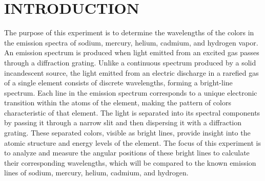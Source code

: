 \documentclass[a4paper,11pt]{article}
\begin{document}
\newpage
\renewcommand{\contentsname}{CONTENTS}
\renewcommand{\cftsecleader}{\cftdotfill{\cftdotsep}} %
\renewcommand{\cftdotsep}{1.0} %
\begin{center}
\tableofcontents
\end{center}
\label{sec:CONTENTS}

\newpage
\renewcommand{\listtablename}{LIST OF TABLES}
{}
\label{sec:LIST OF TABLES}
\begin{center}
\listoftables
\end{center}

\newpage
\renewcommand{\listfigurename}{LIST OF FIGURES}
{}
\label{sec:LIST OF FIGURES}
\begin{center}
\listoffigures
\end{center}

\newpage
{} 
\section*{\center INTRODUCTION}
\label{sec:INTRODUCTION}

\qquad The purpose of this experiment is to determine the wavelengths of the colors in the emission spectra of sodium, mercury, helium, cadmium, and hydrogen vapor. An emission spectrum is produced when light emitted from an excited gas passes through a diffraction grating. Unlike a continuous spectrum produced by a solid incandescent source, the light emitted from an electric discharge in a rarefied gas of a single element consists of discrete wavelengths, forming a bright-line spectrum. Each line in the emission spectrum corresponds to a unique electronic transition within the atoms of the element, making the pattern of colors characteristic of that element. The light is separated into its spectral components by passing it through a narrow slit and then dispersing it with a diffraction grating. These separated colors, visible as bright lines, provide insight into the atomic structure and energy levels of the element. The focus of this experiment is to analyze and measure the angular positions of these bright lines to calculate their corresponding wavelengths, which will be compared to the known emission lines of sodium, mercury, helium, cadmium, and hydrogen.
\end{document}
